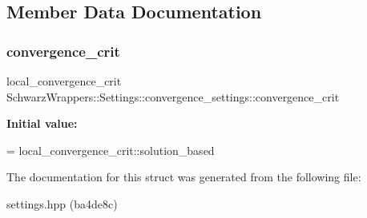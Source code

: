 \subsection{Member Data Documentation}
\mbox{\label{structSchwarzWrappers_1_1Settings_1_1convergence__settings_ac02528dbce2827b664ba9e7545f1cfdc}} 
\subsubsection{\texorpdfstring{convergence\+\_\+crit}{convergence\_crit}}
{\footnotesize\ttfamily local\+\_\+convergence\+\_\+crit Schwarz\+Wrappers\+::\+Settings\+::convergence\+\_\+settings\+::convergence\+\_\+crit}

{\bfseries Initial value\+:}
\begin{DoxyCode}
=
            local\_convergence\_crit::solution\_based
\end{DoxyCode}


The documentation for this struct was generated from the following file\+:\begin{DoxyCompactItemize}
\item 
settings.\+hpp (ba4de8c)\end{DoxyCompactItemize}

